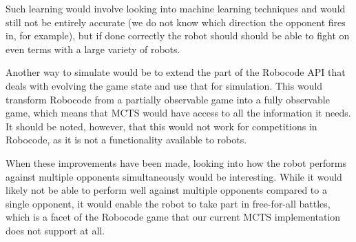 Such learning would involve looking into machine learning techniques and would still not be entirely accurate (we do not know which direction the opponent fires in, for example), but if done correctly the robot should should be able to fight on even terms with a large variety of robots.

Another way to simulate would be to extend the part of the Robocode API that deals with evolving the game state and use that for simulation. This would transform Robocode from a partially observable game into a fully observable game, which means that MCTS would have access to all the information it needs. It should be noted, however, that this would not work for competitions in Robocode, as it is not a functionality available to robots.

When these improvements have been made, looking into how the robot performs against multiple opponents simultaneously would be interesting. While it would likely not be able to perform well against multiple opponents compared to a single opponent, it would enable the robot to take part in free-for-all battles, which is a facet of the Robocode game that our current MCTS implementation does not support at all.

